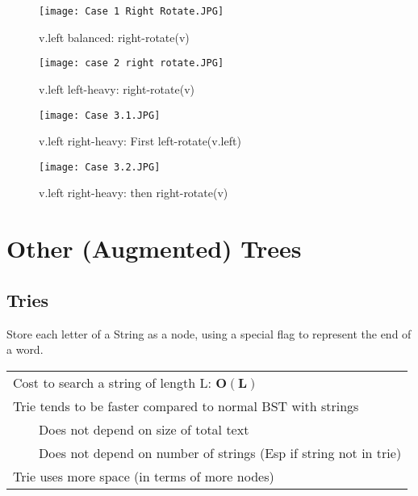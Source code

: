 \documentclass{article}
\newcommand{\tabitem}{~~\llap{\textbullet}~~}
\begin{document}
    \begin{figure}[htbp]
        \begin{center}
        \texttt{[image: Case 1 Right Rotate.JPG]}
        \caption{v.left balanced: right-rotate(v)}
        \label{rightrot}
        \end{center}
    \end{figure}

    \begin{figure}[htbp]
        \begin{center}
        \texttt{[image: case 2 right rotate.JPG]}
        \caption{v.left left-heavy: right-rotate(v)}
        \label{rightrot2}
        \end{center}
    \end{figure}

    \begin{figure}[htbp]
        \begin{center}
        \texttt{[image: Case 3.1.JPG]}
        \caption{v.left right-heavy: First left-rotate(v.left)}
        \label{case31}
        \end{center}
    \end{figure}

    \begin{figure}[htbp]
        \begin{center}
        \texttt{[image: Case 3.2.JPG]}
        \caption{v.left right-heavy: then right-rotate(v)}
        \label{case32}
        \end{center}
    \end{figure}


    \pagebreak

    \section{Other (Augmented) Trees}
    \subsection{Tries}
    Store each letter of a String as a node, using a special flag to represent the end of a word.

    \begin{tabular}{l}
        Cost to search a string of length L: $\bm{O(L)}$\\
        Trie tends to be faster compared to normal BST with strings\\
        \tabitem Does not depend on size of total text\\
        \tabitem Does not depend on number of strings (Esp if string not in trie)\\
        Trie uses more space (in terms of more nodes)
    \end{tabular}
    
\end{document}
